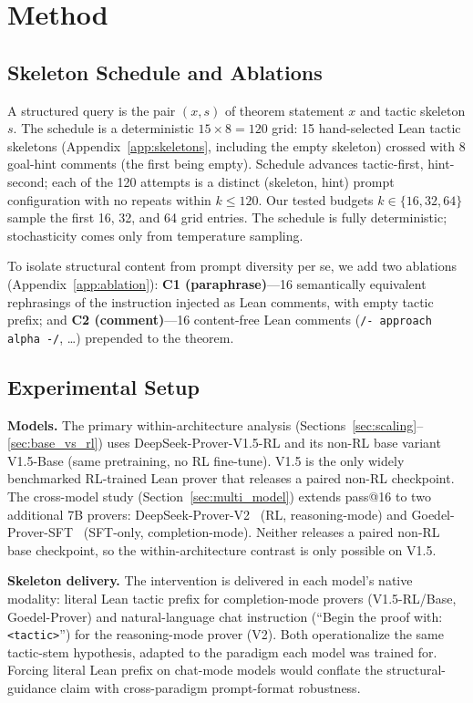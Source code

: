 \documentclass{article}
\begin{document}
\section{Method}

\subsection{Skeleton Schedule and Ablations}
\label{sec:methods_schedule}

A structured query is the pair $(x, s)$ of theorem statement $x$ and tactic skeleton $s$. The schedule is a deterministic $15{\times}8{=}120$ grid: 15 hand-selected Lean tactic skeletons (Appendix~\ref{app:skeletons}, including the empty skeleton) crossed with 8 goal-hint comments (the first being empty). Schedule advances tactic-first, hint-second; each of the 120 attempts is a distinct (skeleton, hint) prompt configuration with no repeats within $k{\leq}120$. Our tested budgets $k\in\{16,32,64\}$ sample the first 16, 32, and 64 grid entries. The schedule is fully deterministic; stochasticity comes only from temperature sampling.

To isolate structural content from prompt diversity per se, we add two ablations (Appendix~\ref{app:ablation}): \textbf{C1 (paraphrase)}---16 semantically equivalent rephrasings of the instruction injected as Lean comments, with empty tactic prefix; and \textbf{C2 (comment)}---16 content-free Lean comments (\texttt{/- approach alpha -/}, \dots) prepended to the theorem.

\subsection{Experimental Setup}
\label{sec:setup}

\textbf{Models.} The primary within-architecture analysis (Sections~\ref{sec:scaling}--\ref{sec:base_vs_rl}) uses DeepSeek-Prover-V1.5-RL and its non-RL base variant V1.5-Base (same pretraining, no RL fine-tune). V1.5 is the only widely benchmarked RL-trained Lean prover that releases a paired non-RL checkpoint. The cross-model study (Section~\ref{sec:multi_model}) extends pass@16 to two additional 7B provers: DeepSeek-Prover-V2~\cite{deepseekv2prover} (RL, reasoning-mode) and Goedel-Prover-SFT~\cite{lin2025goedel} (SFT-only, completion-mode). Neither releases a paired non-RL base checkpoint, so the within-architecture contrast is only possible on V1.5.

\textbf{Skeleton delivery.} The intervention is delivered in each model's native modality: literal Lean tactic prefix for completion-mode provers (V1.5-RL/Base, Goedel-Prover) and natural-language chat instruction (``Begin the proof with: \texttt{<tactic>}'') for the reasoning-mode prover (V2). Both operationalize the same tactic-stem hypothesis, adapted to the paradigm each model was trained for. Forcing literal Lean prefix on chat-mode models would conflate the structural-guidance claim with cross-paradigm prompt-format robustness.
\end{document}
